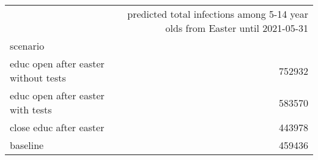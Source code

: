 \begin{tabular}{lr}
\toprule
{} &  predicted total infections among 5-14 year olds from Easter until 2021-05-31 \\
scenario                               &                                                                               \\
\midrule
 educ open after easter  without tests &                                             752932 \\
 educ open after easter  with tests    &                                             583570 \\
 close educ after easter               &                                             443978 \\
 baseline                              &                                             459436 \\
\bottomrule
\end{tabular}
